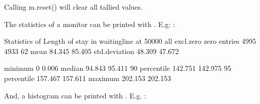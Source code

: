 \documentclass[letterpaper,10pt,english]{sphinxmanual}
\begin{document}
\begin{sphinxVerbatim}[commandchars=\\\{\}]
  
  
 
\end{sphinxVerbatim}

Calling m.reset() will clear all tallied values.

The statistics of a monitor can be printed with .
E.g: :

\begin{sphinxVerbatim}[commandchars=\\\{\}]
Statistics of Length of stay in waitingline at     50000
                        all    excl.zero         zero
\PYGZhy{}\PYGZhy{}\PYGZhy{}\PYGZhy{}\PYGZhy{}\PYGZhy{}\PYGZhy{}\PYGZhy{}\PYGZhy{}\PYGZhy{}\PYGZhy{}\PYGZhy{}\PYGZhy{}\PYGZhy{} \PYGZhy{}\PYGZhy{}\PYGZhy{}\PYGZhy{}\PYGZhy{}\PYGZhy{}\PYGZhy{}\PYGZhy{}\PYGZhy{}\PYGZhy{}\PYGZhy{}\PYGZhy{} \PYGZhy{}\PYGZhy{}\PYGZhy{}\PYGZhy{}\PYGZhy{}\PYGZhy{}\PYGZhy{}\PYGZhy{}\PYGZhy{}\PYGZhy{}\PYGZhy{}\PYGZhy{} \PYGZhy{}\PYGZhy{}\PYGZhy{}\PYGZhy{}\PYGZhy{}\PYGZhy{}\PYGZhy{}\PYGZhy{}\PYGZhy{}\PYGZhy{}\PYGZhy{}\PYGZhy{}
entries            4995         4933           62
mean                 84.345       85.405
std.deviation        48.309       47.672

minimum               0            0.006
median               94.843       95.411
90\PYGZpc{} percentile      142.751      142.975
95\PYGZpc{} percentile      157.467      157.611
maximum             202.153      202.153
\end{sphinxVerbatim}

And, a histogram can be printed with . E.g.
:
\end{document}
